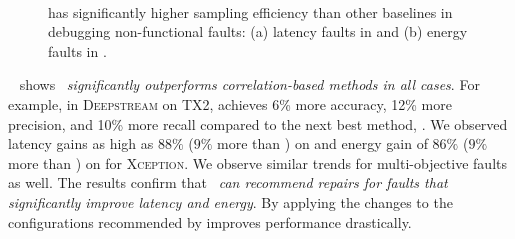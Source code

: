 \begin{figure}[tb!]
    \setlength{\belowcaptionskip}{-1.5em}
    \\
    \vspace{-1.5em}
 
    \caption{\small{\ourapproach has significantly higher sampling efficiency than other baselines in debugging non-functional faults: (a) latency faults in \txtwo and (b) energy faults in \xavier.}}%
    \label{tab:rq2_1}
\end{figure}
~ shows \ourapproach ~{\em significantly outperforms correlation-based methods in all cases}. For example, in  \textsc{Deepstream} on TX2, \ourapproach achieves 6\% more accuracy, 12\% more precision, and 10\% more recall compared to the next best method, \bugdoc. We observed latency gains as high as $88\%$ ($9\%$ more than \bugdoc) on \txtwo and energy gain of $86\%$ ($9\%$ more than \bugdoc) on \xavier for \textsc{Xception}. We observe similar trends for multi-objective faults as well. The results confirm that \ourapproach~{\em can recommend repairs for faults that significantly improve latency and energy}. By applying the changes to the configurations recommended by \ourapproach improves performance drastically. 


